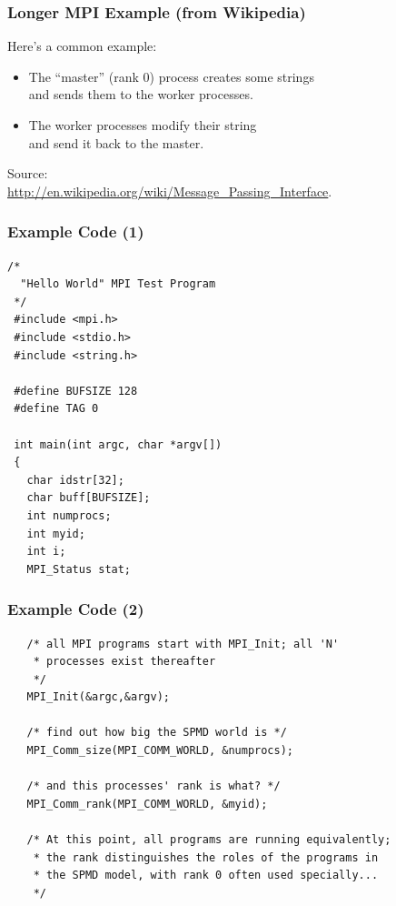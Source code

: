 \begin{frame}
  \frametitle{Longer MPI Example (from Wikipedia)}
  

  Here's a common example:

  \begin{itemize}
    \item The ``master'' (rank 0) process creates some strings \\ \qquad and sends them
      to the worker processes.
    \item The worker processes modify their string \\ \qquad and send it back to the master.
  \end{itemize}

  Source:\\
  {\small \url{http://en.wikipedia.org/wiki/Message_Passing_Interface}}.

  
\end{frame}

\begin{frame}[fragile]
  \frametitle{Example Code (1)}
  

  \begin{lstlisting}
/*
  "Hello World" MPI Test Program
 */
 #include <mpi.h>
 #include <stdio.h>
 #include <string.h>
 
 #define BUFSIZE 128
 #define TAG 0
 
 int main(int argc, char *argv[])
 {
   char idstr[32];
   char buff[BUFSIZE];
   int numprocs;
   int myid;
   int i;
   MPI_Status stat;
  \end{lstlisting}
  
\end{frame}

\begin{frame}[fragile]
  \frametitle{Example Code (2)}
  

  \begin{lstlisting}
   /* all MPI programs start with MPI_Init; all 'N'
    * processes exist thereafter
    */
   MPI_Init(&argc,&argv); 

   /* find out how big the SPMD world is */
   MPI_Comm_size(MPI_COMM_WORLD, &numprocs);

   /* and this processes' rank is what? */
   MPI_Comm_rank(MPI_COMM_WORLD, &myid);
 
   /* At this point, all programs are running equivalently;
    * the rank distinguishes the roles of the programs in
    * the SPMD model, with rank 0 often used specially...
    */
  \end{lstlisting}
  
\end{frame}

